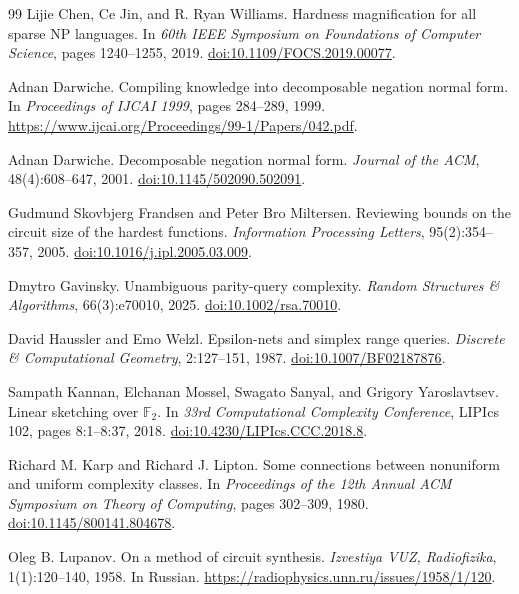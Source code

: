 \documentclass[11pt]{article}
\theoremstyle{definition}
\theoremstyle{remark}
\newcommand{\F}{\mathbb F}
\begin{document}
\begin{thebibliography}{99}
Lijie Chen, Ce Jin, and R. Ryan Williams.
\newblock Hardness magnification for all sparse NP languages.
\newblock In \emph{60th IEEE Symposium on Foundations of Computer Science},
pages 1240--1255, 2019.
\newblock \href{https://doi.org/10.1109/FOCS.2019.00077}{doi:10.1109/FOCS.2019.00077}.

Adnan Darwiche.
\newblock Compiling knowledge into decomposable negation normal form.
\newblock In \emph{Proceedings of IJCAI 1999}, pages 284--289, 1999.
\newblock \url{https://www.ijcai.org/Proceedings/99-1/Papers/042.pdf}.

Adnan Darwiche.
\newblock Decomposable negation normal form.
\newblock \emph{Journal of the ACM}, 48(4):608--647, 2001.
\newblock \href{https://doi.org/10.1145/502090.502091}{doi:10.1145/502090.502091}.

Gudmund Skovbjerg Frandsen and Peter Bro Miltersen.
\newblock Reviewing bounds on the circuit size of the hardest functions.
\newblock \emph{Information Processing Letters}, 95(2):354--357, 2005.
\newblock \href{https://doi.org/10.1016/j.ipl.2005.03.009}{doi:10.1016/j.ipl.2005.03.009}.

Dmytro Gavinsky.
\newblock Unambiguous parity-query complexity.
\newblock \emph{Random Structures \& Algorithms}, 66(3):e70010, 2025.
\newblock \href{https://doi.org/10.1002/rsa.70010}{doi:10.1002/rsa.70010}.

David Haussler and Emo Welzl.
\newblock Epsilon-nets and simplex range queries.
\newblock \emph{Discrete \& Computational Geometry}, 2:127--151, 1987.
\newblock \href{https://doi.org/10.1007/BF02187876}{doi:10.1007/BF02187876}.

Sampath Kannan, Elchanan Mossel, Swagato Sanyal, and Grigory Yaroslavtsev.
\newblock Linear sketching over $\F_2$.
\newblock In \emph{33rd Computational Complexity Conference}, LIPIcs 102,
pages 8:1--8:37, 2018.
\newblock \href{https://doi.org/10.4230/LIPIcs.CCC.2018.8}{doi:10.4230/LIPIcs.CCC.2018.8}.

Richard M. Karp and Richard J. Lipton.
\newblock Some connections between nonuniform and uniform complexity classes.
\newblock In \emph{Proceedings of the 12th Annual ACM Symposium on Theory of
Computing}, pages 302--309, 1980.
\newblock \href{https://doi.org/10.1145/800141.804678}{doi:10.1145/800141.804678}.

Oleg B. Lupanov.
\newblock On a method of circuit synthesis.
\newblock \emph{Izvestiya VUZ, Radiofizika}, 1(1):120--140, 1958.
\newblock In Russian. \url{https://radiophysics.unn.ru/issues/1958/1/120}.


\end{thebibliography}
\end{document}
